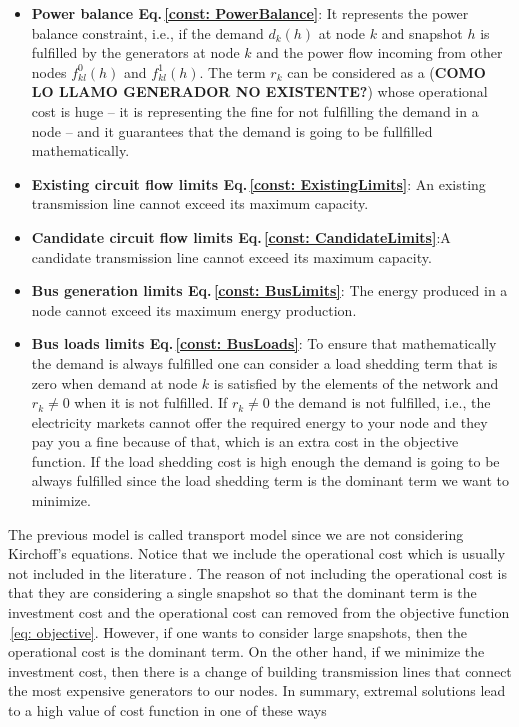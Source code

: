 \begin{itemize}
    \item \textbf{Power balance Eq.\,\eqref{const: PowerBalance}}: It represents the power balance constraint, i.e., if the demand $d_{k}(h)$ at node $k$ and snapshot $h$ is fulfilled by the generators at node $k$ and the power flow incoming from other nodes $f_{kl}^{0}(h)$ and $f_{kl}^{1}(h)$. The term $r_{k}$ can be considered as a (\textbf{COMO LO LLAMO GENERADOR NO EXISTENTE?}) whose operational cost is huge -- it is representing the fine for not fulfilling the demand in a node -- and it guarantees that the demand is going to be fullfilled mathematically. 
    \item \textbf{Existing circuit flow limits Eq.\,\eqref{const: ExistingLimits}}: An existing transmission line cannot exceed its maximum capacity.
    \item \textbf{Candidate circuit flow limits Eq.\,\eqref{const: CandidateLimits}}:A candidate transmission line cannot exceed its maximum capacity.
    \item \textbf{Bus generation limits Eq.\,\eqref{const: BusLimits}}: The energy produced in a node cannot exceed its maximum energy production.
    \item \textbf{Bus loads limits Eq.\,\eqref{const: BusLoads}}: To ensure that mathematically the demand is always fulfilled one can consider a load shedding term that is zero when demand at node $k$ is satisfied by the elements of the network and $r_{k} \neq 0$ when it is not fulfilled. If $r_{k} \neq 0$ the demand is not fulfilled, i.e., the electricity markets cannot offer the required energy to your node and they pay you a fine because of that, which is an extra cost in the objective function. If the load shedding cost is high enough the demand is going to be always fulfilled since the load shedding term is the dominant term we want to minimize.
\end{itemize}
The previous model is called transport model since we are not considering Kirchoff's equations. Notice that we include the operational cost which is usually not included in the literature\,\cite{Gomes2019}. The reason of not including the operational cost is that they are considering a single snapshot so that the dominant term is the investment cost and the operational cost can removed from the objective function \,\eqref{eq: objective}. However, if one wants to consider large snapshots, then the operational cost is the dominant term. On the other hand, if we minimize the investment cost, then there is a change of building transmission lines that connect the most expensive generators to our nodes. In summary, extremal solutions lead to a high value of cost function in one of these ways
